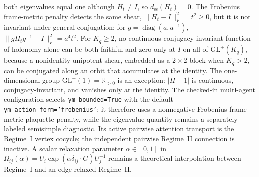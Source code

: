 \documentclass[11pt]{article}
\begin{document}
both eigenvalues equal one although $H_t\ne I$, so $d_{\mathrm{ss}}(H_t)=0$. The Frobenius frame-metric penalty detects the same shear, $\|H_t-I\|_F^2=t^2\ge0$, but it is not invariant under general conjugation: for $g=\operatorname{diag}(a,a^{-1})$, $\|gH_tg^{-1}-I\|_F^2=a^4t^2$. For $K_q\geq2$, no continuous conjugacy-invariant function of holonomy alone can be both faithful and zero only at $I$ on all of $\mathrm{GL}^+(K_q)$, because a nonidentity unipotent shear, embedded as a $2\times2$ block when $K_q>2$, can be conjugated along an orbit that accumulates at the identity. The one-dimensional group $\mathrm{GL}^+(1)=\mathbb{R}_{>0}$ is an exception: $|H-1|$ is continuous, conjugacy-invariant, and vanishes only at the identity. The checked-in multi-agent configuration selects \texttt{ym\_bounded=True} with the default \texttt{ym\_action\_form='frobenius'}; it therefore uses a nonnegative Frobenius frame-metric plaquette penalty, while the eigenvalue quantity remains a separately labeled semisimple diagnostic. Its active pairwise attention transport is the Regime~I vertex cocycle; the independent pairwise Regime~II connection is inactive. A scalar relaxation parameter $\alpha\in[0,1]$ in $\Omega_{ij}(\alpha)=U_i\exp(\alpha\delta_{ij}\cdot G)U_j^{-1}$ remains a theoretical interpolation between Regime~I and an edge-relaxed Regime~II.
\end{document}

